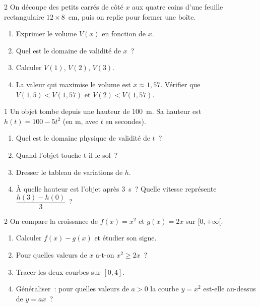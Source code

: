 \begin{probleme}{2}
On d\'ecoupe des petits carr\'es de c\^ot\'e $x$ aux quatre coins d'une
feuille rectangulaire $12\times8$~cm, puis on replie pour former une bo\^ite.
\begin{enumerate}
  \item Exprimer le volume $V(x)$ en fonction de $x$.
  \item Quel est le domaine de validit\'e de $x$~?
  \item Calculer $V(1)$, $V(2)$, $V(3)$.
  \item La valeur qui maximise le volume est $x\approx1{,}57$.
        V\'erifier que $V(1{,}5)<V(1{,}57)$ et $V(2)<V(1{,}57)$.
\end{enumerate}
\end{probleme}

\begin{probleme}{1}
Un objet tombe depuis une hauteur de $100$~m.
Sa hauteur est $h(t)=100-5t^2$ (en m, avec $t$ en secondes).
\begin{enumerate}
  \item Quel est le domaine physique de validit\'e de $t$~?
  \item Quand l'objet touche-t-il le sol~?
  \item Dresser le tableau de variations de $h$.
  \item \`A quelle hauteur est l'objet apr\`es $3$~s~?
        Quelle vitesse repr\'esente $\dfrac{h(3)-h(0)}{3}$~?
\end{enumerate}
\end{probleme}

\begin{probleme}{2}
On compare la croissance de $f(x)=x^2$ et $g(x)=2x$ sur $[0,+\infty[$.
\begin{enumerate}
  \item Calculer $f(x)-g(x)$ et \'etudier son signe.
  \item Pour quelles valeurs de $x$ a-t-on $x^2\geq 2x$~?
  \item Tracer les deux courbes sur $[0,4]$.
  \item G\'en\'eraliser~: pour quelles valeurs de $a>0$ la courbe
        $y=x^2$ est-elle au-dessus de $y=ax$~?
\end{enumerate}
\end{probleme}

